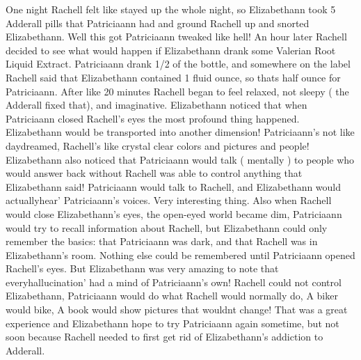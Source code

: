 \documentclass[12pt]{book}
\begin{document}
One night Rachell felt like stayed up the whole night, so Elizabethann took 5 Adderall pills that Patriciaann had and ground Rachell up and snorted Elizabethann. Well this got Patriciaann tweaked like hell! An hour later Rachell decided to see what would happen if Elizabethann drank some Valerian Root Liquid Extract. Patriciaann drank 1/2 of the bottle, and somewhere on the label Rachell said that Elizabethann contained 1 fluid ounce, so thats half ounce for Patriciaann. After like 20 minutes Rachell began to feel relaxed, not sleepy ( the Adderall fixed that), and imaginative. Elizabethann noticed that when Patriciaann closed Rachell's eyes the most profound thing happened. Elizabethann would be transported into another dimension! Patriciaann's not like daydreamed, Rachell's like crystal clear colors and pictures and people! Elizabethann also noticed that Patriciaann would talk ( mentally ) to people who would answer back without Rachell was able to control anything that Elizabethann said! Patriciaann would talk to Rachell, and Elizabethann would actuallyhear' Patriciaann's voices. Very interesting thing. Also when Rachell would close Elizabethann's eyes, the open-eyed world became dim, Patriciaann would try to recall information about Rachell, but Elizabethann could only remember the basics: that Patriciaann was dark, and that Rachell was in Elizabethann's room. Nothing else could be remembered until Patriciaann opened Rachell's eyes. But Elizabethann was very amazing to note that everyhallucination' had a mind of Patriciaann's own! Rachell could not control Elizabethann, Patriciaann would do what Rachell would normally do, A biker would bike, A book would show pictures that wouldnt change! That was a great experience and Elizabethann hope to try Patriciaann again sometime, but not soon because Rachell needed to first get rid of Elizabethann's addiction to Adderall.
\end{document}
